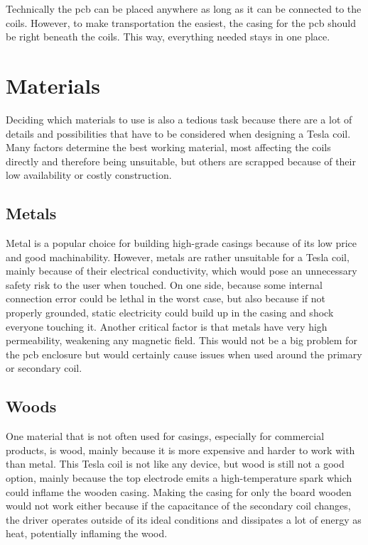 Technically the \gls{pcb} can be placed anywhere as long as it can be connected to the coils. However, to make transportation the easiest, the casing for the \gls{pcb} should be right beneath the coils. This way, everything needed stays in one place. 

\section{Materials}

Deciding which materials to use is also a tedious task because there are a lot of details and possibilities that have to be considered when designing a Tesla coil. Many factors determine the best working material, most affecting the coils directly and therefore being unsuitable, but others are scrapped because of their low availability or costly construction.

\subsection{Metals}
\label{subsec:materials-metals}

Metal is a popular choice for building high-grade casings because of its low price and good machinability. However, metals are rather unsuitable for a Tesla coil, mainly because of their electrical conductivity, which would pose an unnecessary safety risk to the user when touched. On one side, because some internal connection error could be lethal in the worst case, but also because if not properly grounded, static electricity could build up in the casing and shock everyone touching it. Another critical factor is that metals have very high permeability, weakening any magnetic field. This would not be a big problem for the \gls{pcb} enclosure but would certainly cause issues when used around the primary or secondary coil.

\subsection{Woods}

One material that is not often used for casings, especially for commercial products, is wood, mainly because it is more expensive and harder to work with than metal. This Tesla coil is not like any device, but wood is still not a good option, mainly because the top electrode emits a high-temperature spark which could inflame the wooden casing. Making the casing for only the board wooden would not work either because if the capacitance of the secondary coil changes, the driver operates outside of its ideal conditions and dissipates a lot of energy as heat, potentially inflaming the wood.


